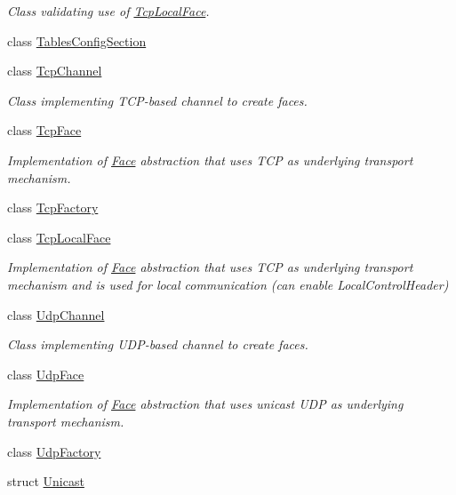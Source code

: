 \begin{DoxyCompactItemize}
\begin{DoxyCompactList}\small\item\em Class validating use of \hyperlink{classnfd_1_1TcpLocalFace}{Tcp\+Local\+Face}. \end{DoxyCompactList}\item 
class \hyperlink{classnfd_1_1TablesConfigSection}{Tables\+Config\+Section}
\item 
class \hyperlink{classnfd_1_1TcpChannel}{Tcp\+Channel}
\begin{DoxyCompactList}\small\item\em Class implementing T\+C\+P-\/based channel to create faces. \end{DoxyCompactList}\item 
class \hyperlink{classnfd_1_1TcpFace}{Tcp\+Face}
\begin{DoxyCompactList}\small\item\em Implementation of \hyperlink{classnfd_1_1Face}{Face} abstraction that uses T\+CP as underlying transport mechanism. \end{DoxyCompactList}\item 
class \hyperlink{classnfd_1_1TcpFactory}{Tcp\+Factory}
\item 
class \hyperlink{classnfd_1_1TcpLocalFace}{Tcp\+Local\+Face}
\begin{DoxyCompactList}\small\item\em Implementation of \hyperlink{classnfd_1_1Face}{Face} abstraction that uses T\+CP as underlying transport mechanism and is used for local communication (can enable Local\+Control\+Header) \end{DoxyCompactList}\item 
class \hyperlink{classnfd_1_1UdpChannel}{Udp\+Channel}
\begin{DoxyCompactList}\small\item\em Class implementing U\+D\+P-\/based channel to create faces. \end{DoxyCompactList}\item 
class \hyperlink{classnfd_1_1UdpFace}{Udp\+Face}
\begin{DoxyCompactList}\small\item\em Implementation of \hyperlink{classnfd_1_1Face}{Face} abstraction that uses unicast U\+DP as underlying transport mechanism. \end{DoxyCompactList}\item 
class \hyperlink{classnfd_1_1UdpFactory}{Udp\+Factory}
\item 
struct \hyperlink{structnfd_1_1Unicast}{Unicast}

\end{DoxyCompactItemize}
